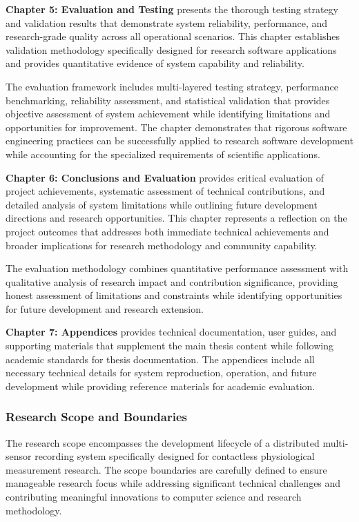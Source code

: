 \documentclass[11pt,a4paper]{article}
\begin{document}
\textbf{Chapter 5: Evaluation and Testing} presents the thorough testing strategy and validation results that
demonstrate system reliability, performance, and research-grade quality across all
operational scenarios.  This chapter
establishes validation methodology specifically designed for research software
applications and provides quantitative
evidence of system capability and reliability.

The evaluation framework includes multi-layered testing strategy, performance
benchmarking, reliability assessment, and
statistical validation that provides objective assessment of system achievement while
identifying limitations and
opportunities for improvement.  The chapter demonstrates that rigorous software
engineering practices can be successfully
applied to research software development while accounting for the specialized
requirements of scientific applications.

\textbf{Chapter 6: Conclusions and Evaluation} provides critical evaluation of project achievements, systematic assessment of
technical contributions, and detailed analysis of system limitations while outlining
future development directions
and research opportunities.  This chapter represents a reflection on the
project outcomes that addresses
both immediate technical achievements and broader implications for research
methodology and community capability.

The evaluation methodology combines quantitative performance assessment with
qualitative analysis of research impact and
contribution significance, providing honest assessment of limitations and constraints
while identifying opportunities
for future development and research extension.

\textbf{Chapter 7: Appendices} provides technical documentation, user guides, and supporting materials that
supplement the main thesis content while following academic standards for thesis
documentation.  The appendices include
all necessary technical details for system reproduction, operation, and future
development while providing
reference materials for academic evaluation.

\subsubsection{Research Scope and Boundaries}

The research scope encompasses the development lifecycle of a distributed
multi-sensor recording system
specifically designed for contactless physiological measurement research.  The scope
boundaries are carefully defined to
ensure manageable research focus while addressing significant technical challenges
and contributing meaningful
innovations to computer science and research methodology.
\end{document}
